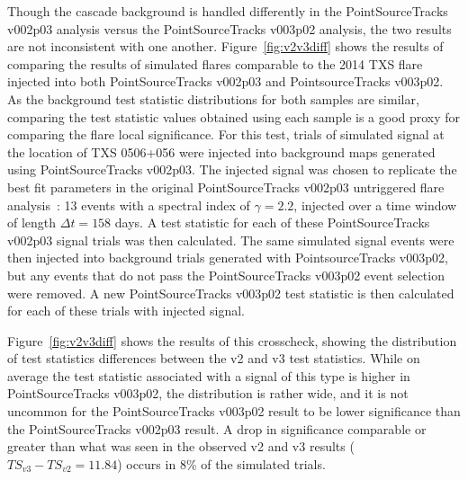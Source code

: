 Though the cascade background is handled differently in the PointSourceTracks v002p03 analysis versus the PointSourceTracks v003p02 analysis, the two results are not inconsistent with one another. Figure~\ref{fig:v2v3diff} shows the results of comparing the results of simulated flares comparable to the 2014 TXS flare injected into both PointSourceTracks v002p03 and PointsourceTracks v003p02.   As the background test statistic distributions for both samples are similar, comparing the test statistic values obtained using each sample is a good proxy for comparing the flare local significance.  For this test, trials of simulated signal at the location of TXS 0506+056 were injected into background maps generated using PointSourceTracks v002p03. The injected signal was chosen to replicate the best fit parameters in the original PointSourceTracks v002p03 untriggered flare analysis~\cite{TXS_Archival}: 13 events with a spectral index of $\gamma=2.2$, injected over a time window of length $\Delta t = 158$ days. A test statistic for each of these PointSourceTracks v002p03 signal trials was then calculated. The same simulated signal events were then injected into background trials generated with PointsourceTracks v003p02, but any events that do not pass the PointSourceTracks v003p02 event selection were removed.  A new PointSourceTracks v003p02 test statistic is then calculated for each of these trials with injected signal. 

Figure~\ref{fig:v2v3diff} shows the results of this crosscheck, showing the distribution of test statistics differences between the v2 and v3 test statistics. While on average the test statistic associated with a signal of this type is higher in PointSourceTracks v003p02, the distribution is rather wide, and it is not uncommon for the PointSourceTracks v003p02 result to be lower significance than the PointSourceTracks v002p03 result. A drop in significance comparable or greater than what was seen in the observed v2 and v3 results ($TS_{v3}-TS_{v2}=11.84$) occurs in 8\% of the simulated trials. 


